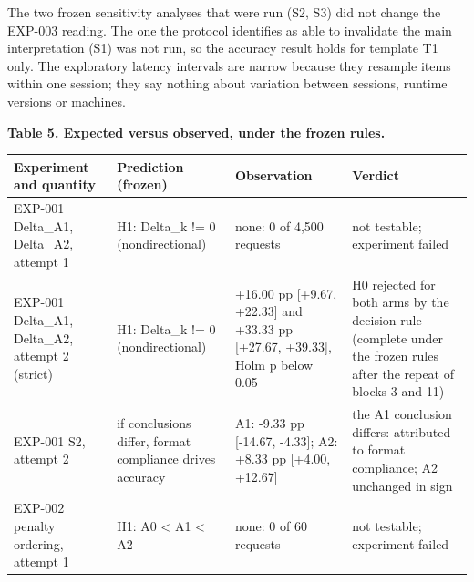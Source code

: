 \documentclass[
]{article}
\begin{document}
The two frozen sensitivity analyses that were run (S2, S3) did not
change the EXP-003 reading. The one the protocol identifies as able to
invalidate the main interpretation (S1) was not run, so the accuracy
result holds for template T1 only. The exploratory latency intervals are
narrow because they resample items within one session; they say nothing
about variation between sessions, runtime versions or machines.

\textbf{Table 5. Expected versus observed, under the frozen rules.}

\begin{longtable}[]{@{}
  >{\raggedright\arraybackslash}p{}
  >{\raggedright\arraybackslash}p{}
  >{\raggedright\arraybackslash}p{}
  >{\raggedright\arraybackslash}p{}@{}}
\toprule\noalign{}
\begin{minipage}[b]{\linewidth}\raggedright
Experiment and quantity
\end{minipage} & \begin{minipage}[b]{\linewidth}\raggedright
Prediction (frozen)
\end{minipage} & \begin{minipage}[b]{\linewidth}\raggedright
Observation
\end{minipage} & \begin{minipage}[b]{\linewidth}\raggedright
Verdict
\end{minipage} \\
\midrule\noalign{}
\endhead
\bottomrule\noalign{}
\endlastfoot
EXP-001 Delta\_A1, Delta\_A2, attempt 1 & H1: Delta\_k != 0
(nondirectional) & none: 0 of 4,500 requests & not testable; experiment
failed \\
EXP-001 Delta\_A1, Delta\_A2, attempt 2 (strict) & H1: Delta\_k != 0
(nondirectional) & +16.00 pp {[}+9.67, +22.33{]} and +33.33 pp
{[}+27.67, +39.33{]}, Holm p below 0.05 & H0 rejected for both arms by
the decision rule (complete under the frozen rules after the repeat of
blocks 3 and 11) \\
EXP-001 S2, attempt 2 & if conclusions differ, format compliance drives
accuracy & A1: -9.33 pp {[}-14.67, -4.33{]}; A2: +8.33 pp {[}+4.00,
+12.67{]} & the A1 conclusion differs: attributed to format compliance;
A2 unchanged in sign \\
EXP-002 penalty ordering, attempt 1 & H1: A0 \textless{} A1 \textless{}
A2 & none: 0 of 60 requests & not testable; experiment failed \\

\end{longtable}
\end{document}
